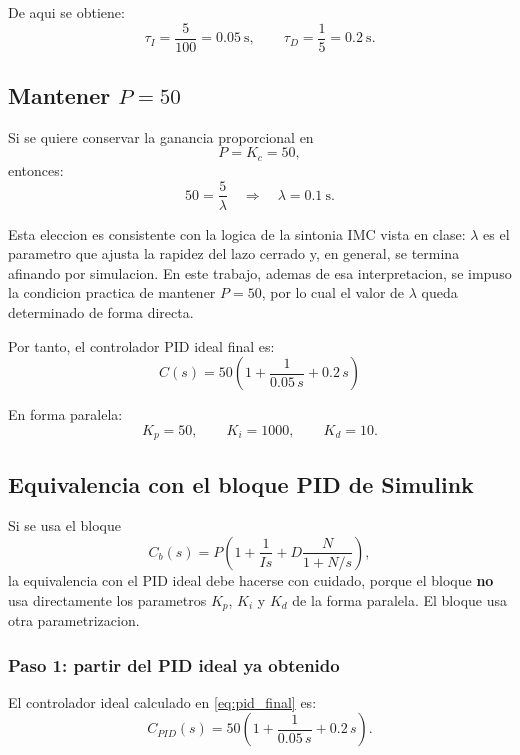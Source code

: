 \documentclass[11pt]{article}
\begin{document}
De aqui se obtiene:
\begin{equation}
\tau_I=\frac{5}{100}=0.05\ \text{s},
\qquad
\tau_D=\frac{1}{5}=0.2\ \text{s}.
\end{equation}

\subsection{Mantener $P=50$}

Si se quiere conservar la ganancia proporcional en
\[
P=K_c=50,
\]
entonces:
\begin{equation}
50=\frac{5}{\lambda}
\quad\Rightarrow\quad
\lambda=0.1\ \text{s}.
\end{equation}

Esta eleccion es consistente con la logica de la sintonia IMC vista en clase: $\lambda$ es el parametro que ajusta la rapidez del lazo cerrado y, en general, se termina afinando por simulacion. En este trabajo, ademas de esa interpretacion, se impuso la condicion practica de mantener $P=50$, por lo cual el valor de $\lambda$ queda determinado de forma directa.

Por tanto, el controlador PID ideal final es:
\begin{equation}
\boxed{
C(s)=50\left(1+\frac{1}{0.05\,s}+0.2\,s\right)
}
\label{eq:pid_final}
\end{equation}

En forma paralela:
\[
K_p=50,\qquad K_i=1000,\qquad K_d=10.
\]

\subsection{Equivalencia con el bloque PID de Simulink}

Si se usa el bloque
\begin{equation}
C_b(s)=P\left(1+\frac{1}{Is}+D\frac{N}{1+N/s}\right),
\label{eq:bloque_pid}
\end{equation}
la equivalencia con el PID ideal debe hacerse con cuidado, porque el bloque \textbf{no} usa directamente los parametros $K_p$, $K_i$ y $K_d$ de la forma paralela. El bloque usa otra parametrizacion.

\subsubsection{Paso 1: partir del PID ideal ya obtenido}

El controlador ideal calculado en \eqref{eq:pid_final} es:
\begin{equation}
C_{PID}(s)=50\left(1+\frac{1}{0.05\,s}+0.2\,s\right).
\label{eq:pid_ideal_bloque}
\end{equation}
\end{document}
